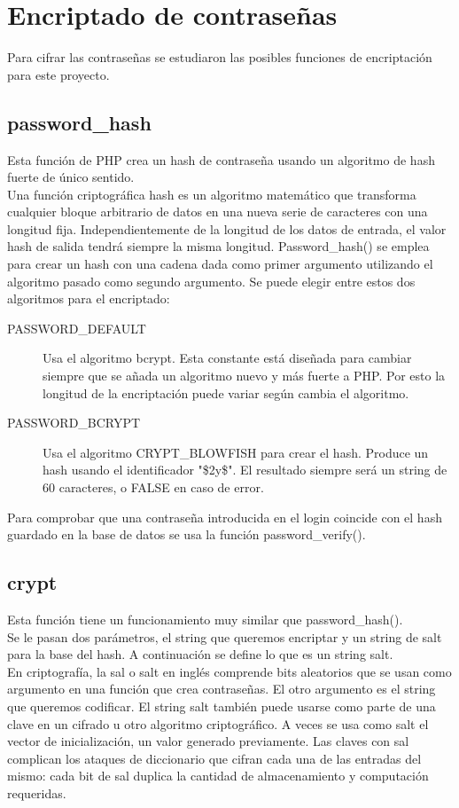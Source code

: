 \section{Encriptado de contraseñas}
Para cifrar las contraseñas se estudiaron las posibles funciones de encriptación para este proyecto.
\subsection{password\_hash}
Esta función de PHP crea un hash de contraseña usando un algoritmo de hash fuerte de único sentido.\\
Una función criptográfica hash es un algoritmo matemático que transforma cualquier bloque arbitrario de datos en una nueva serie de caracteres con una longitud fija. Independientemente de la longitud de los datos de entrada, el valor hash de salida tendrá siempre la misma longitud.\cite{definicionHash}
Password\_hash() se emplea para crear un hash con una cadena dada como primer argumento utilizando el algoritmo pasado como segundo argumento. 
Se puede elegir entre estos dos algoritmos para el encriptado:
\begin{description}
    \item [PASSWORD\_DEFAULT] Usa el algoritmo bcrypt. Esta constante está diseñada para cambiar siempre que se añada un algoritmo nuevo y más fuerte a PHP. Por esto la longitud de la encriptación puede variar según cambia el algoritmo.
    \item [PASSWORD\_BCRYPT] Usa el algoritmo CRYPT\_BLOWFISH para crear el hash. Produce un hash usando el identificador "\$2y\$". El resultado siempre será un string de 60 caracteres, o FALSE en caso de error.
\end{description}
Para comprobar que una contraseña introducida en el login coincide con el hash guardado en la base de datos se usa la función password\_verify().\cite{passwordHash}
\subsection{crypt}
Esta función tiene un funcionamiento muy similar que password\_hash().\\
Se le pasan dos parámetros, el string que queremos encriptar y un string de salt para la base del hash.\cite{crypt} A continuación se define lo que es un string salt.\\
En criptografía, la sal o salt en inglés comprende bits aleatorios que se usan como argumento en una función que crea contraseñas. El otro argumento es el string que queremos codificar. El string salt también puede usarse como parte de una clave en un cifrado u otro algoritmo criptográfico. A veces se usa como salt el vector de inicialización, un valor generado previamente.
Las claves con sal complican los ataques de diccionario que cifran cada una de las entradas del mismo: cada bit de sal duplica la cantidad de almacenamiento y computación requeridas.\cite{salt}

